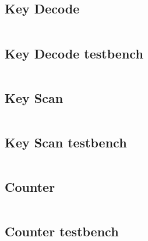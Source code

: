 \documentclass[10pt,a4paper,twocolumn]{article}
\begin{document}
\subsection{Key Decode}
\label{sec:KeyDecode_VHDL}
\begin{minipage}{\linewidth}
\footnotesize
\inputminted{vhdl}{vhdl/KeyDecode.vhd}
\label{vhdl:KeyDecode}
\end{minipage}

\subsection{Key Decode testbench}
\label{sec:KeyDecode_tb_VHDL}
\begin{minipage}{\linewidth}
\footnotesize
\inputminted{vhdl}{vhdl/KeyDecode_tb.vhd}
\label{vhdl:KeyDecode_tb}
\end{minipage}

\subsection{Key Scan}
\label{sec:KeyScan_VHDL}
\begin{minipage}{\linewidth}
\footnotesize
\inputminted{vhdl}{vhdl/KeyScan.vhd}
\label{vhdl:KeyScan}
\end{minipage}

\subsection{Key Scan testbench}
\label{sec:KeyScan_tb_VHDL}
\begin{minipage}{\linewidth}
\footnotesize
\inputminted{vhdl}{vhdl/KeyScan_tb.vhd}
\label{vhdl:KeyScan_tb}
\end{minipage}

\subsection{Counter}
\label{sec:Counter_VHDL}
\begin{minipage}{\linewidth}
\footnotesize
\inputminted{vhdl}{vhdl/Counter.vhd}
\label{vhdl:Counter}
\end{minipage}

\subsection{Counter testbench}
\label{sec:Counter_tb_VHDL}
\begin{minipage}{\linewidth}
\footnotesize
\inputminted{vhdl}{vhdl/Counter_tb.vhd}
\label{vhdl:Counter_tb}
\end{minipage}
\end{document}
